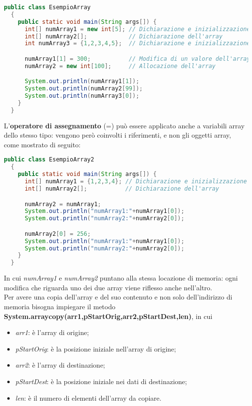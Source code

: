 \documentclass[a4paper]{extarticle}
\begin{document}
\vspace{1em}
\noindent
\begin{lstlisting}[language=Java, caption=Esempio di array in Java]
  public class EsempioArray
  {
    public static void main(String args[]) {
      int[] numArray1 = new int[5]; // Dichiarazione e inizializzazione dell'array
      int[] numArray2[];            // Dichiarazione dell'array
      int numArray3 = {1,2,3,4,5};  // Dichiarazione e inizializzazione dell'array

      numArray1[1] = 300;           // Modifica di un valore dell'array
      numArray2 = new int[100];     // Allocazione dell'array

      System.out.println(numArray1[1]);
      System.out.println(numArray2[99]);
      System.out.println(numArray3[0]);
    }
  }
\end{lstlisting}

\vspace{1em}
\noindent
L’\textbf{operatore di assegnamento} (=) può essere applicato anche a variabili array dello stesso tipo: vengono però coinvolti i riferimenti, e non gli oggetti array, come mostrato di seguito:

\vspace{1em}
\noindent
\begin{lstlisting}[language=Java, caption=Operazioni di assegnamento tra array in Java]
  public class EsempioArray2
  {
    public static void main(String args[]) {
      int[] numArray1 = {1,2,3,4}; // Dichiarazione e inizializzazione dell'array
      int[] numArray2[];           // Dichiarazione dell'array

      numArray2 = numArray1;
      System.out.println("numArray1:"+numArray1[0]);
      System.out.println("numArray2:"+numArray2[0]);

      numArray2[0] = 256;
      System.out.println("numArray1:"+numArray1[0]);
      System.out.println("numArray2:"+numArray2[0]);
    }
  }
\end{lstlisting}

\vspace{1em}
\noindent
In cui \emph{numArray1} e \emph{numArray2} puntano alla stessa locazione di memoria: ogni modifica che riguarda uno dei due array viene riflesso anche nell'altro.\\
Per avere una copia dell'array e del suo contenuto e non solo dell'indirizzo di memoria bisogna impiegare il metodo \textbf{System.arraycopy(arr1,pStartOrig,arr2,pStartDest,len)}, in cui
\begin{itemize}
  \item \emph{arr1}: è l'array di origine;
  \item \emph{pStartOrig}: è la posizione iniziale nell'array di origine;
  \item \emph{arr2}: è l'array di destinazione;
  \item \emph{pStartDest}: è la posizione iniziale nei dati di destinazione;
  \item \emph{len}: è il numero di elementi dell'array da copiare.
\end{itemize}
\end{document}
